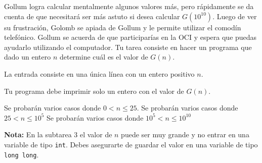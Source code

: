 \documentclass{oci}
\begin{document}
\begin{problemDescription}
Gollum logra calcular mentalmente algunos valores más, pero rápidamente se da cuenta de que necesitará ser más astuto si desea calcular $G(10^{10})$.
Luego de ver su frustración, Golomb se apiada de Gollum y le permite utilizar el comodín telefónico.
Gollum se acuerda de que participarías en la OCI y espera que puedas ayudarlo utilizando el computador.
Tu tarea consiste en hacer un programa que dado un entero $n$ determine cuál es el valor de $G(n)$.
\end{problemDescription}

\begin{inputDescription}
  La entrada consiste en una única línea con un entero positivo $n$.
\end{inputDescription}

\begin{outputDescription}
  Tu programa debe imprimir solo un entero con el valor de $G(n)$.
\end{outputDescription}

\begin{scoreDescription}
   Se probarán varios casos donde $0 < n \leq 25$.
   Se probarán varios casos donde $25 < n \leq 10^5$
   Se probarán varios casos donde $10^5 < n \leq 10^{10}$
\end{scoreDescription}
\textbf{Nota:} En la subtarea 3 el valor de $n$ puede ser muy grande y no entrar en una variable de tipo \texttt{int}. Debes asegurarte de guardar el valor en una variable de tipo \texttt{long long}.

\begin{sampleDescription}
\end{sampleDescription}
\end{document}
